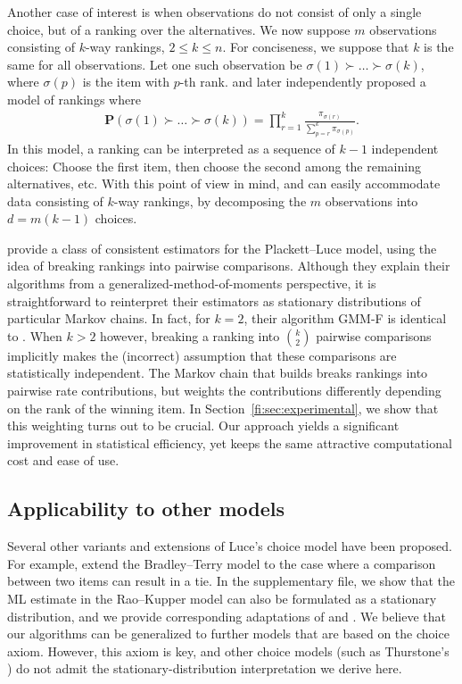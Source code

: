 Another case of interest is when observations do not consist of only a single choice, but of a ranking over the alternatives.
We now suppose $m$ observations consisting of $k$-way rankings, $2 \le k \le n$.
For conciseness, we suppose that $k$ is the same for all observations.
Let one such observation be $\sigma(1) \succ \ldots \succ \sigma(k)$, where $\sigma(p)$ is the item with $p$-th rank.
\citet{luce1959individual} and later \citet{plackett1975analysis} independently proposed a model of rankings where
\begin{align*}
\mathbf{P}\left( \sigma(1) \succ \ldots \succ \sigma(k) \right)
  = \prod_{r = 1}^{k} \frac{\pi_{\sigma(r)}}{\sum_{p = r}^{k} \pi_{\sigma(p)}}.
\end{align*}
In this model, a ranking can be interpreted as a sequence of $k-1$ independent choices:
Choose the first item, then choose the second among the remaining alternatives, etc.
With this point of view in mind, \LSR{} and \ILSR{} can easily accommodate data consisting of $k$-way rankings, by decomposing the $m$ observations into $d = m (k - 1)$ choices.

\citet{azari2013generalized} provide a class of consistent estimators for the Plackett--Luce model, using the idea of breaking rankings into pairwise comparisons.
Although they explain their algorithms from a generalized-method-of-moments perspective, it is straightforward to reinterpret their estimators as stationary distributions of particular Markov chains.
In fact, for $k = 2$, their algorithm GMM-F is identical to \LSR{}.
When $k > 2$ however, breaking a ranking into $\binom{k}{2}$ pairwise comparisons implicitly makes the (incorrect) assumption that these comparisons are statistically independent.
The Markov chain that \LSR{} builds breaks rankings into pairwise rate contributions, but weights the contributions differently depending on the rank of the winning item.
In Section~\ref{fi:sec:experimental}, we show that this weighting turns out to be crucial.
Our approach yields a significant improvement in statistical efficiency, yet keeps the same attractive computational cost and ease of use.


\subsection{Applicability to other models}

Several other variants and extensions of Luce's choice model have been proposed.
For example, \citet{rao1967ties} extend the Bradley--Terry model to the case where a comparison between two items can result in a tie.
In the supplementary file, we show that the ML estimate in the Rao--Kupper model can also be formulated as a stationary distribution, and we provide corresponding adaptations of \LSR{} and \ILSR{}.
We believe that our algorithms can be generalized to further models that are based on the choice axiom.
However, this axiom is key, and other choice models (such as Thurstone's \citep{thurstone1927method}) do not admit the stationary-distribution interpretation we derive here.
